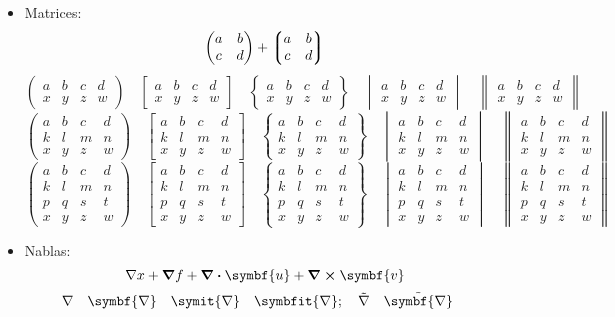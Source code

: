 \documentclass{article}
\def\MATRIXII{a & b & c & d \\ x & y & z & w}
\def\MATRIXIII{a & b & c & d \\ k & l & m & n \\ x & y & z & w}
\def\MATRIXIV{a & b & c & d \\ k & l & m & n \\ p & q & s & t \\ x & y & z & w}
\begin{document}
\begin{itemize}
  \item Matrices:
        \[ \mqty(a & b \\ c & d) + \mqty*(a & b \\ c & d) \]
        \[
          \begin{pmatrix} \MATRIXII  \end{pmatrix} \quad
          \begin{bmatrix} \MATRIXII  \end{bmatrix} \quad
          \begin{Bmatrix} \MATRIXII  \end{Bmatrix} \quad
          \begin{vmatrix} \MATRIXII  \end{vmatrix} \quad
          \begin{Vmatrix} \MATRIXII  \end{Vmatrix}
        \]
        \[
          \begin{pmatrix} \MATRIXIII \end{pmatrix} \quad
          \begin{bmatrix} \MATRIXIII \end{bmatrix} \quad
          \begin{Bmatrix} \MATRIXIII \end{Bmatrix} \quad
          \begin{vmatrix} \MATRIXIII \end{vmatrix} \quad
          \begin{Vmatrix} \MATRIXIII \end{Vmatrix}
        \]
        \[
          \begin{pmatrix} \MATRIXIV  \end{pmatrix} \quad
          \begin{bmatrix} \MATRIXIV  \end{bmatrix} \quad
          \begin{Bmatrix} \MATRIXIV  \end{Bmatrix} \quad
          \begin{vmatrix} \MATRIXIV  \end{vmatrix} \quad
          \begin{Vmatrix} \MATRIXIV  \end{Vmatrix}
        \]
  \item Nablas:
        \[ \nabla x + \grad{f} + \divergence{\symbf{u}} + \curl{\symbf{v}} \]
        \[
          \nabla                 \quad \symbf{\nabla}           \quad
          \symit{\nabla}         \quad \symbfit{\nabla};        \quad
          \tilde{\nabla}         \quad \tilde{\symbf{\nabla}}   \quad
\]
\end{itemize}
\end{document}

